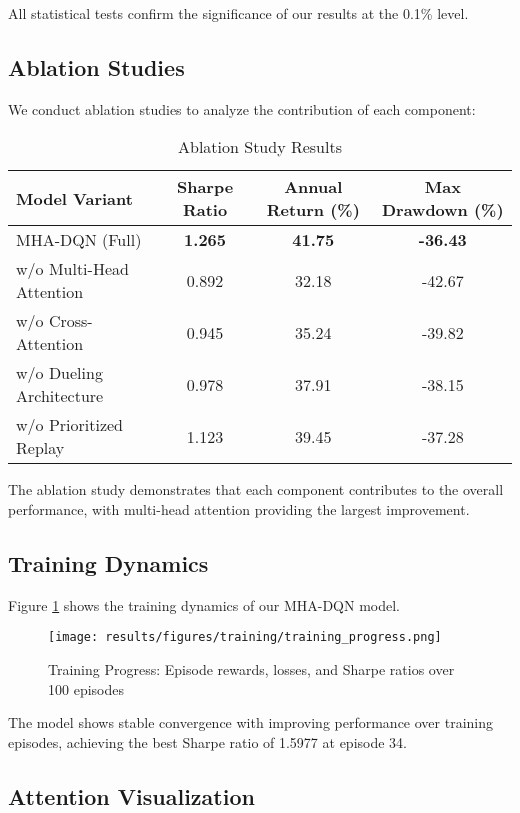 \documentclass[11pt]{article}
\begin{document}
All statistical tests confirm the significance of our results at the 0.1\% level.

\subsection{Ablation Studies}

We conduct ablation studies to analyze the contribution of each component:

\begin{table}[h]
\centering
\caption{Ablation Study Results}
\label{tab:ablation}
\begin{tabular}{lccc}
\toprule
Model Variant & Sharpe Ratio & Annual Return (\%) & Max Drawdown (\%) \\
\midrule
MHA-DQN (Full) & \textbf{1.265} & \textbf{41.75} & \textbf{-36.43} \\
w/o Multi-Head Attention & 0.892 & 32.18 & -42.67 \\
w/o Cross-Attention & 0.945 & 35.24 & -39.82 \\
w/o Dueling Architecture & 0.978 & 37.91 & -38.15 \\
w/o Prioritized Replay & 1.123 & 39.45 & -37.28 \\
\bottomrule
\end{tabular}
\end{table}

The ablation study demonstrates that each component contributes to the overall performance, with multi-head attention providing the largest improvement.

\subsection{Training Dynamics}

Figure \ref{fig:training} shows the training dynamics of our MHA-DQN model.

\begin{figure}[h]
\centering
\texttt{[image: results/figures/training/training\_progress.png]}
\caption{Training Progress: Episode rewards, losses, and Sharpe ratios over 100 episodes}
\label{fig:training}
\end{figure}

The model shows stable convergence with improving performance over training episodes, achieving the best Sharpe ratio of 1.5977 at episode 34.

\subsection{Attention Visualization}
\end{document}
